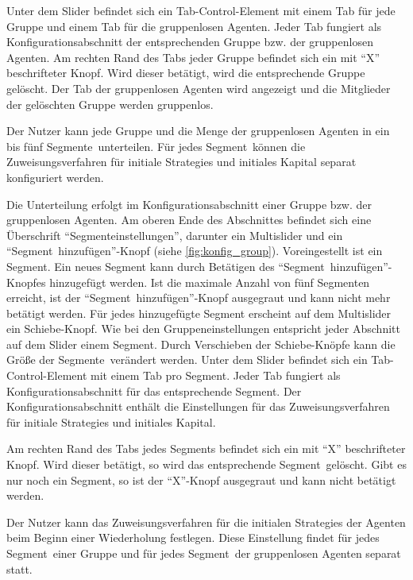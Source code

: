 \documentclass[parskip=full,11pt]{scrartcl}
\def\segment{Segment}
\def\segments{Segmente}
\begin{document}
Unter dem Slider befindet sich ein Tab-Control-Element mit einem Tab für jede Gruppe und einem Tab für die gruppenlosen Agenten. Jeder Tab fungiert als Konfigurationsabschnitt der entsprechenden Gruppe bzw. der gruppenlosen Agenten. Am rechten Rand des Tabs jeder Gruppe befindet sich ein mit \enquote{X} beschrifteter Knopf. Wird dieser betätigt, wird die entsprechende Gruppe gelöscht. Der Tab der gruppenlosen Agenten wird angezeigt und die Mitglieder der gelöschten Gruppe werden gruppenlos.

\functionality{Einteilung von Gruppen in \segments}{fnc:segments}
Der \Gls{Nutzer} kann jede Gruppe und die Menge der gruppenlosen Agenten in ein bis fünf \segments\ unterteilen. Für jedes \segment\ können die Zuweisungsverfahren für initiale \Glspl{Strategie} und initiales Kapital separat konfiguriert werden.

Die Unterteilung erfolgt im Konfigurationsabschnitt einer Gruppe bzw. der gruppenlosen Agenten. Am oberen Ende des Abschnittes befindet sich eine Überschrift \enquote{\segment einstellungen}, darunter ein \Gls{Multislider} und ein \enquote{\segment\ hinzufügen}-Knopf (siehe \cref{fig:konfig_group}). Voreingestellt ist ein Segment. Ein neues Segment kann durch Betätigen des \enquote{\segment\ hinzufügen}-Knopfes hinzugefügt werden. Ist die maximale Anzahl von fünf \segments n erreicht, ist der \enquote{\segment\ hinzufügen}-Knopf ausgegraut und kann nicht mehr betätigt werden. Für jedes hinzugefügte Segment erscheint auf dem \Gls{Multislider} ein Schiebe-Knopf. Wie bei den Gruppeneinstellungen entspricht jeder Abschnitt auf dem Slider einem \segment. Durch Verschieben der Schiebe-Knöpfe kann die Größe der \segments\ verändert werden. Unter dem Slider befindet sich ein Tab-Control-Element mit einem Tab pro \segment. Jeder Tab fungiert als Konfigurationsabschnitt für das entsprechende \segment. Der Konfigurationsabschnitt enthält die Einstellungen für das Zuweisungsverfahren für initiale \Glspl{Strategie} und initiales Kapital.

Am rechten Rand des Tabs jedes \segment s befindet sich ein mit \enquote{X} beschrifteter Knopf. Wird dieser betätigt, so wird das entsprechende \segment\ gelöscht. Gibt es nur noch ein \segment, so ist der \enquote{X}-Knopf ausgegraut und kann nicht betätigt werden.

Der \Gls{Nutzer} kann das Zuweisungsverfahren für die initialen \Glspl{Strategie} der Agenten beim Beginn einer Wiederholung festlegen. Diese Einstellung findet für jedes \segment\ einer Gruppe und für jedes \segment\ der gruppenlosen Agenten separat statt.
\end{document}
